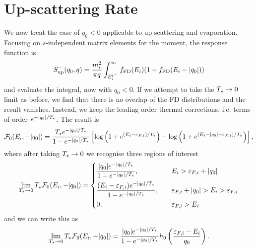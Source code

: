 \section{Up-scattering Rate}
\label{subsec:up_scatter_derivation}

We now treat the case of $q_0<0$ applicable to up scattering and evaporation. Focusing on $s$-independent matrix elements for the moment, the response function is
\begin{equation}
    S^{-}_\mathrm{up}(q_0, q) = \frac{m_i^2}{\pi q}\int_{E_i^{t^-}}^\infty f_{\rm FD}(E_i)(1 - f_{\rm FD}(E_i -|q_0|))
\end{equation}
and evaluate the integral, now with $q_0 <0$. If we attempt to take the $T_\star\rightarrow 0$ limit as before, we find that there is no overlap of the FD distributions and the result vanishes. Instead, we keep the leading order thermal corrections, i.e. terms of order $e^{-|q_0|/T_\star}$. The result is 
\begin{equation}
        \mathcal{F}_0(E_i, -|q_0|) = \frac{T_\star e^{-|q_0|/T_\star}}{1 - e^{-|q_0|/T_\star}} \left[ \log\left( 1 + e^{(E_i-\varepsilon_{F,i})/T_\star}\right) - \log\left( 1 + e^{(E_i-|q_0|-\varepsilon_{F,i})/T_\star}\right)\right],
\end{equation}
where after taking $T_\star \rightarrow 0$ we recognise three regions of interest
\begin{equation}
    \lim_{T_\star \rightarrow 0}T_\star \mathcal{F}_0(E_i, -|q_0|) = 
    \begin{dcases}
        \frac{|q_0| e^{-|q_0|/T_\star}}{1 - e^{-|q_0|/T_\star}},&\quad E_i>\varepsilon_{F,i} +|q_0|\\  
        \frac{(E_i-\varepsilon_{F,i}) e^{-|q_0|/T_\star}}{1 - e^{-|q_0|/T_\star}},&\quad \varepsilon_{F,i} + |q_0| > E_i > \varepsilon_{F,i}\\
        0, & \quad \varepsilon_{F,i}>E_i
    \end{dcases}
\end{equation}
and we can write this as
\begin{equation}
    \lim_{T_\star \rightarrow 0}T_\star \mathcal{F}_0(E_i, -|q_0|) = \frac{|q_0| e^{-|q_0|/T_\star}}{1 - e^{-|q_0|/T_\star}}h_0\left(\frac{\varepsilon_{F,i} - E_i}{q_0}\right).
\end{equation}

